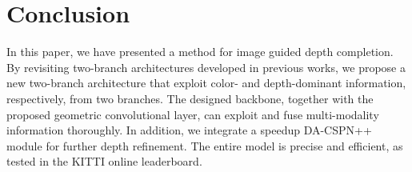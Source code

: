 \documentclass[letterpaper, 10 pt, conference]{ieeeconf}
\begin{document}
\section{Conclusion}
In this paper, we have presented a method for image guided depth completion. By revisiting two-branch architectures developed in previous works, we propose a new two-branch architecture that exploit color- and depth-dominant information, respectively, from two branches. The designed backbone, together with the proposed geometric convolutional layer, can exploit and fuse multi-modality information thoroughly. In addition, we integrate a speedup DA-CSPN++ module for further depth refinement. The entire model is precise and efficient, as tested in the KITTI online leaderboard.



\addtolength{\textheight}{-8cm}   



\end{document}
